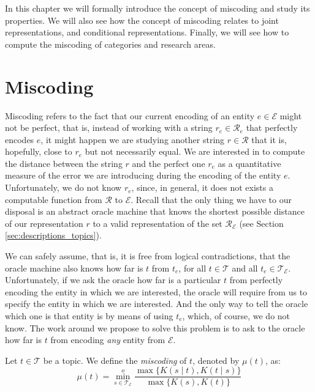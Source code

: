 In this chapter we will formally introduce the concept of miscoding and study its properties. We will also see how the concept of miscoding relates to joint representations, and conditional representations. Finally, we will see how to compute the miscoding of categories and research areas.

%
%
\section{Miscoding}
\label{sec:miscoding}

Miscoding refers to the fact that our current encoding of an entity $e \in \mathcal{E}$ might not be perfect, that is, instead of working with a string $r_e \in \mathcal{R}_e$ that perfectly encodes $e$, it might happen we are studying another string $r \in \mathcal{R}$ that it is, hopefully, close to $r_e$ but not necessarily equal. We are interested in to compute the distance between the string $r$ and the perfect one $r_e$ as a quantitative measure of the error we are introducing during the encoding of the entity $e$. Unfortunately, we do not know $r_e$, since, in general, it does not exists a computable function from $\mathcal{R}$ to $\mathcal{E}$. Recall that the only thing we have to our disposal is an abstract oracle machine that knows the shortest possible distance of our representation $r$ to a valid representation of the set $\mathcal{R}_\mathcal{E}$ (see Section \ref{sec:descriptions_topics}).

We can safely assume, that is, it is free from logical contradictions, that the oracle machine also knows how far is $t$ from $t_e$, for all $t \in \mathcal{T}$ and all $t_e \in \mathcal{T}_\mathcal{E}$. Unfortunately, if we ask the oracle how far is a particular $t$ from perfectly encoding the entity in which we are interested, the oracle will require from us to specify the entity in which we are interested. And the only way to tell the oracle which one is that entity is by means of using $t_e$, which, of course, we do not know. The work around we propose to solve this problem is to ask to the oracle how far is $t$ from encoding \emph{any} entity from $\mathcal{E}$.

\begin{definition} [Miscoding]
\label{def:miscoding}
Let $t \in \mathcal{T}$ be a topic. We define the \emph{miscoding} of $t$, denoted by $\mu(t)$, as:
\[
\mu(t) = \overset{o}{ \underset{s \in \mathcal{T}_\mathcal{E}} \min} \frac{ \max\{ K(s \mid t), K(t \mid s) \} } { \max\{ K(s), K(t) \} }
\]
\end{definition}

